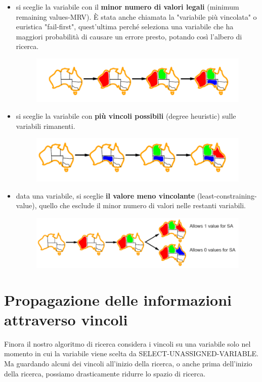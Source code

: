 \begin{itemize}
    \item si sceglie la variabile con il \textbf{minor numero di valori legali} (minimum remaining values-MRV). È stata anche chiamata la "variabile più vincolata" o euristica "fail-first", quest'ultima perché seleziona una variabile che ha maggiori probabilità di causare un errore presto, potando così l'albero di ricerca.
          \begin{figure}[H]
              \centering
              \includegraphics[width=12cm, keepaspectratio]{img/Cap2/m1.png}
          \end{figure}
    \item si sceglie la variabile con \textbf{più vincoli possibili} (degree heuristic) sulle variabili rimanenti.
          \begin{figure}[H]
              \centering
              \includegraphics[width=12cm, keepaspectratio]{img/Cap2/m2.png}
          \end{figure}
    \item data una variabile, si sceglie \textbf{il valore meno vincolante} (least-constraining-value), quello che esclude il minor numero di valori nelle restanti variabili.
          \begin{figure}[H]
              \centering
              \includegraphics[width=12cm, keepaspectratio]{img/Cap2/m3.png}
          \end{figure}
\end{itemize}

\section{Propagazione delle informazioni attraverso vincoli}
Finora il nostro algoritmo di ricerca considera i vincoli su una variabile solo nel momento in cui la variabile viene scelta da SELECT-UNASSIGNED-VARIABLE. Ma guardando alcuni dei vincoli all'inizio della ricerca, o anche prima dell'inizio della ricerca, possiamo drasticamente ridurre lo spazio di ricerca.
